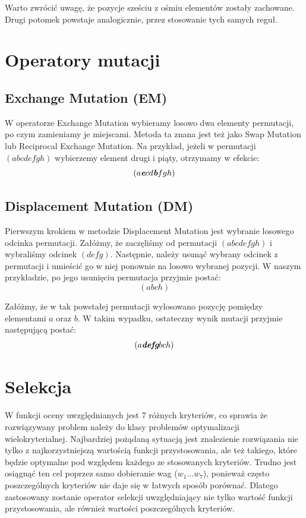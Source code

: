 \documentclass[brudnopis]{xmgr}
\begin{document}
Warto zwrócić uwagę, że pozycje sześciu z ośmiu elementów zostały zachowane. Drugi potomek powstaje analogicznie, przez stosowanie tych samych reguł.


\section{Operatory mutacji}

\subsection{Exchange Mutation (EM)}

W operatorze Exchange Mutation wybieramy losowo dwa elementy permutacji, po czym zamieniamy je miejscami. Metoda ta znana jest też jako Swap Mutation lub Reciprocal Exchange Mutation. Na przykład, jeżeli w permutacji $ (a b c d e f g h) $ wybierzemy element drugi i piąty, otrzymamy w efekcie:
$$ (a \textit{\textbf{e}} c d \textit{\textbf{b}} f g h) $$

\subsection{Displacement Mutation (DM)}

Pierwszym krokiem w metodzie Displacement Mutation jest wybranie losowego odcinka permutacji. Załóżmy, że zaczęliśmy od permutacji $ (a b c d e f g h) $ i wybraliśmy odcinek $ (d e f g) $. Następnie, należy usunąć wybrany odcinek z permutacji i umieścić go w niej ponownie na losowo wybranej pozycji. W naszym przykładzie, po jego usunięciu permutacja przyjmie postać:
$$ (a b c h) $$

Załóżmy, że w tak powstałej permutacji wylosowano pozycję pomiędzy elementami $a$ oraz $b$. W takim wypadku, ostateczny wynik mutacji przyjmie następującą postać:
$$ (a \textit{\textbf{defg}} b c h) $$


\section{Selekcja}

W funkcji oceny uwzględnianych jest 7 różnych kryteriów, co sprawia że rozwiązywany problem należy do klasy problemów optymalizacji wielokryterialnej. Najbardziej pożądaną sytuacją jest znalezienie rozwiązania nie tylko z najkorzystniejszą wartością funkcji przystosowania, ale też takiego, które będzie optymalne pod względem każdego ze stosowanych kryteriów. Trudno jest osiągnąć ten cel poprzez samo dobieranie wag ($w_1 ... w_7$), ponieważ często poszczególnych kryteriów nie daje się w łatwych sposób porównać. Dlatego zastosowany zostanie operator selekcji uwzględniający nie tylko wartość funkcji przystosowania, ale również wartości poszczególnych kryteriów.
\end{document}
